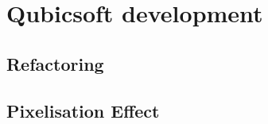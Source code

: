 \documentclass[../../thesis.tex]{subfiles}
\begin{document}
\chapter{Qubicsoft development}

\minitoc

\section{Refactoring}

\section{Pixelisation Effect}
\end{document}
